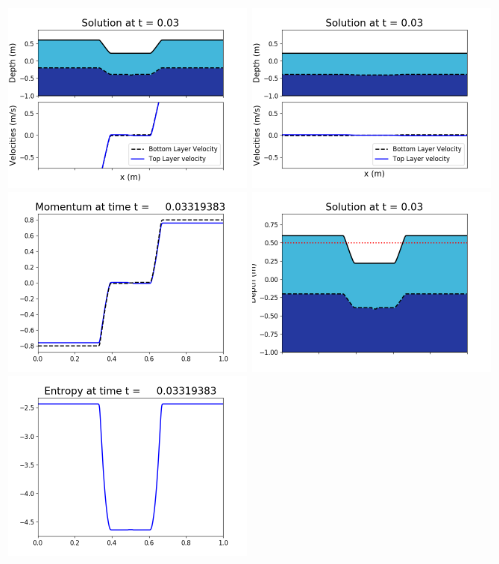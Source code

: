 \documentclass[11pt]{article}
\begin{document}
\vskip 10pt 
\includegraphics[width=0.475\textwidth]{frame0092fig1001.png}
\includegraphics[width=0.475\textwidth]{frame0092fig1002.png}
\vskip 10pt 
\includegraphics[width=0.475\textwidth]{frame0092fig1003.png}
\includegraphics[width=0.475\textwidth]{frame0092fig1006.png}
\vskip 10pt 
\includegraphics[width=0.475\textwidth]{frame0092fig1007.png}
\end{document}
